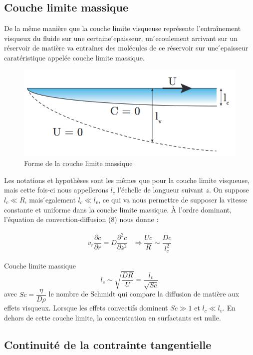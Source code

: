 \documentclass[french, 10pt]{article}
\begin{document}
\subsection{Couche limite massique}
De la même manière que la couche limite visqueuse représente l'entraînement visqueux du fluide sur une
certaine  ́epaisseur, un  ́ecoulement arrivant sur un réservoir de matière va entraîner des molécules de ce réservoir sur une  ́epaisseur caratéristique appelée couche limite massique.

\begin{figure}[ht]
  \centering
  \includegraphics[width=.5\textwidth]{Couchelimitesmassique_marangoni.png}
  \caption{Forme de la couche limite massique}
\end{figure}

Les notations et hypothèses sont les mêmes que pour la couche limite visqueuse, mais cette fois-ci nous appellerons $l_c$ l'échelle de longueur suivant $z$. On suppose $l_c\ll R$, mais  ́egalement $l_c \ll l_v$, ce qui va nous permettre de supposer la vitesse constante et uniforme dans la couche limite massique. À l'ordre dominant, l'équation de convection-diffusion (8) nous donne :

\begin{equation}
  \begin{array}{cc}
  v_r\dfrac{\partial c}{\partial r}=D\dfrac{\partial^2 c}{\partial z^2} & \Rightarrow \dfrac{Uc}{R}\sim \dfrac{Dc}{l_c^2}
  \end{array}
\end{equation}

\begin{Programme}{Couche limite massique}
\begin{equation}
  l_c\sim\sqrt{\dfrac{DR}{U}}=\dfrac{l_v}{\sqrt{Sc}}
\end{equation}
avec $Sc=\dfrac{\eta}{D\rho}$ le nombre de Schmidt qui compare la diffusion de matière aux effets visqueux. Lorsque les effets convectifs dominent $Sc\gg 1$ et $l_c\ll l_v$.  En dehors de cette couche limite, la concentration en surfactants est nulle.
\end{Programme}

\subsection{Continuité de la contrainte tangentielle}
\end{document}
